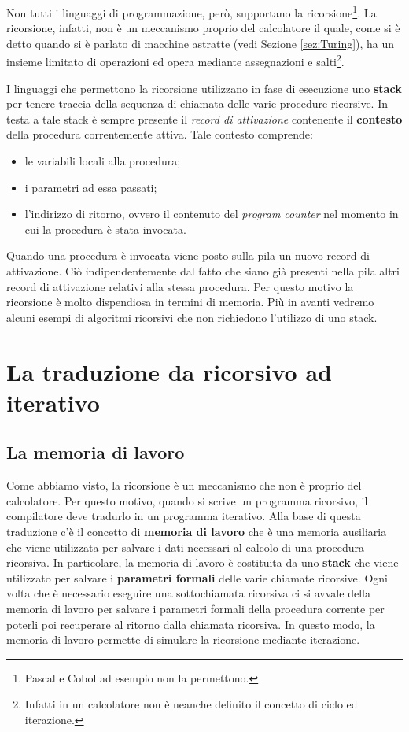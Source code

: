 Non tutti i linguaggi di programmazione, però, supportano la ricorsione\footnote{Pascal e Cobol ad esempio non la permettono.}. La ricorsione, infatti, non è un meccanismo proprio del calcolatore il quale, come si è detto quando si è parlato di macchine astratte (vedi Sezione \ref{sez:Turing}), ha un insieme limitato di operazioni ed opera mediante assegnazioni e salti\footnote{Infatti in un calcolatore non è neanche definito il concetto di ciclo ed iterazione.}.

I linguaggi che permettono la ricorsione utilizzano in fase di esecuzione uno \textbf{stack} per tenere traccia della sequenza di chiamata delle varie procedure ricorsive. In testa a tale stack è sempre presente il \textit{record di attivazione} contenente il \textbf{contesto} della procedura correntemente attiva. Tale contesto comprende:
\begin{itemize}
	\item le variabili locali alla procedura;
	\item i parametri ad essa passati;
	\item l'indirizzo di ritorno, ovvero il contenuto del \textit{program counter} nel momento in cui la procedura è stata invocata.
\end{itemize}

Quando una procedura è invocata viene posto sulla pila un nuovo record di attivazione. Ciò indipendentemente dal fatto che siano già presenti nella pila altri record di attivazione relativi alla stessa procedura. Per questo motivo la ricorsione è molto dispendiosa in termini di memoria. Più in avanti vedremo alcuni esempi di algoritmi ricorsivi che non richiedono l'utilizzo di uno stack.

\section{La traduzione da ricorsivo ad iterativo}
\subsection{La memoria di lavoro}
Come abbiamo visto, la ricorsione è un meccanismo che non è proprio del calcolatore. Per questo motivo, quando si scrive un programma ricorsivo, il compilatore deve tradurlo in un programma iterativo. Alla base di questa traduzione c'è il concetto di \textbf{memoria di lavoro} che è una memoria ausiliaria che viene utilizzata per salvare i dati necessari al calcolo di una procedura ricorsiva. In particolare, la memoria di lavoro è costituita da uno \textbf{stack} che viene utilizzato per salvare i \textbf{parametri formali} delle varie chiamate ricorsive. Ogni volta che è necessario eseguire una sottochiamata ricorsiva ci si avvale della memoria di lavoro per salvare i parametri formali della procedura corrente per poterli poi recuperare al ritorno dalla chiamata ricorsiva. In questo modo, la memoria di lavoro permette di simulare la ricorsione mediante iterazione.

